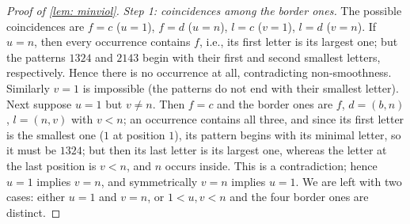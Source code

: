 \documentclass[12pt]{article}
\begin{document}
\begin{proof}[Proof of \cref{lem: minviol}]
\emph{Step 1: coincidences among the border ones.}
The possible coincidences are $f=c$ ($u=1$), $f=d$ ($u=n$), $l=c$ ($v=1$), $l=d$ ($v=n$).
If $u=n$, then every occurrence contains $f$, i.e., its first letter is its largest one; but the patterns $1324$ and
$2143$ begin with their first and second smallest letters, respectively. Hence there is no occurrence at all,
contradicting non-smoothness. Similarly $v=1$ is impossible (the patterns do not end with their smallest letter).
Next suppose $u=1$ but $v\ne n$. Then $f=c$ and the border ones are $f$, $d=(b,n)$, $l=(n,v)$ with $v<n$; an
occurrence contains all three, and since its first letter is the smallest one ($1$ at position $1$), its pattern
begins with its minimal letter, so it must be $1324$; but then its last letter is its largest one, whereas the letter
at the last position is $v<n$, and $n$ occurs inside. This is a contradiction; hence $u=1$ implies $v=n$, and
symmetrically $v=n$ implies $u=1$. We are left with two cases: either $u=1$ and $v=n$, or $1<u,v<n$ and the four
border ones are distinct.


\end{proof}
\end{document}
